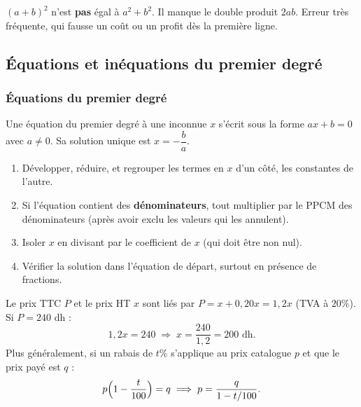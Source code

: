 \documentclass[12pt,a4paper]{article}
\begin{document}
\begin{attentionbox}
$(a+b)^2$ n'est \textbf{pas} égal à $a^2+b^2$. Il manque le double produit $2ab$. Erreur très fréquente, qui fausse un coût ou un profit dès la première ligne.
\end{attentionbox}

\subsection{Équations et inéquations du premier degré}

\subsubsection{Équations du premier degré}

\begin{definitionbox}
Une équation du premier degré à une inconnue $x$ s'écrit sous la forme $ax + b = 0$ avec $a \neq 0$. Sa solution unique est $x = -\dfrac{b}{a}$.
\end{definitionbox}

\begin{methodebox}[-- Résoudre $ax+b=0$ (et les formes équivalentes)]
\begin{enumerate}[leftmargin=1.3cm]
  \item Développer, réduire, et regrouper les termes en $x$ d'un côté, les constantes de l'autre.
  \item Si l'équation contient des \textbf{dénominateurs}, tout multiplier par le PPCM des dénominateurs (après avoir exclu les valeurs qui les annulent).
  \item Isoler $x$ en divisant par le coefficient de $x$ (qui doit être non nul).
  \item Vérifier la solution dans l'équation de départ, surtout en présence de fractions.
\end{enumerate}
\end{methodebox}

\begin{exemplebox}
Le prix TTC $P$ et le prix HT $x$ sont liés par $P = x + 0{,}20x = 1{,}2x$ (TVA à $20\%$). Si $P = 240$ dh :
$$1{,}2x = 240 \;\Longrightarrow\; x = \frac{240}{1{,}2} = 200 \text{ dh.}$$
Plus généralement, si un rabais de $t\%$ s'applique au prix catalogue $p$ et que le prix payé est $q$ :
$$p\Bigl(1-\frac{t}{100}\Bigr) = q \;\Longrightarrow\; p = \frac{q}{1-t/100}.$$
\end{exemplebox}
\end{document}
